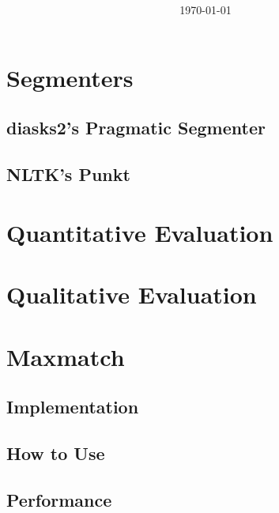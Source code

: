 \documentclass[fleqn]{article}
\title{
	\vspace{2in}
	\textmd{\textbf{\hmwkClass\ \hmwkTitle}}\\
	\large{\hmwkClassInstructor}\\
	\vspace{3in}
}
\author{\textbf{\hmwkAuthorName}}
\date{\today} %
\begin{document}
	\maketitle


\newpage
\tableofcontents
\newpage
\section{Segmenters}
\subsection{diasks2's Pragmatic Segmenter}


\subsection{NLTK’s Punkt}


\section{Quantitative Evaluation}


\section{Qualitative Evaluation}


\section{Maxmatch}
\subsection{Implementation}

\subsection{How to Use}

\subsection{Performance}
\end{document}
